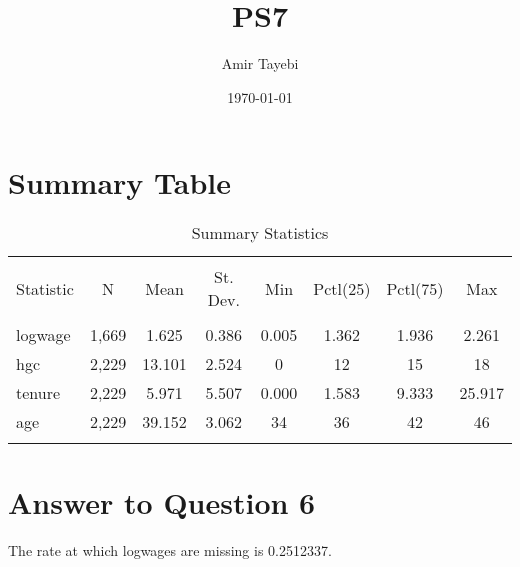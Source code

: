 \documentclass{article}
\title{PS7}
\author{Amir Tayebi }
\date{\today}
\begin{document}
\maketitle

\section{Summary Table}
\begin{table}[!htbp] \centering 
  \caption{Summary Statistics} 
  \label{} 
\begin{tabular}{@{\extracolsep{5pt}}lccccccc} 
\\[-1.8ex]\hline 
\hline \\[-1.8ex] 
Statistic & \multicolumn{1}{c}{N} & \multicolumn{1}{c}{Mean} & \multicolumn{1}{c}{St. Dev.} & \multicolumn{1}{c}{Min} & \multicolumn{1}{c}{Pctl(25)} & \multicolumn{1}{c}{Pctl(75)} & \multicolumn{1}{c}{Max} \\ 
\hline \\[-1.8ex] 
logwage & 1,669 & 1.625 & 0.386 & 0.005 & 1.362 & 1.936 & 2.261 \\ 
hgc & 2,229 & 13.101 & 2.524 & 0 & 12 & 15 & 18 \\ 
tenure & 2,229 & 5.971 & 5.507 & 0.000 & 1.583 & 9.333 & 25.917 \\ 
age & 2,229 & 39.152 & 3.062 & 34 & 36 & 42 & 46 \\ 
\hline \\[-1.8ex] 
\end{tabular} 
\end{table} 

\section{Answer to Question 6}
The rate at which logwages are missing is 0.2512337. 
\end{document}
